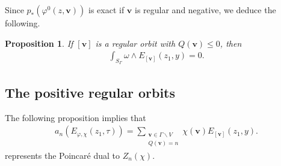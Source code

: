 \documentclass[a4paper,11pt]{amsart} %
\newcommand{\8}{\infty}
\newcommand{\vbf}{\mathbf{v}}
\newcommand{\hooklongrightarrow}{\lhook\joinrel\longrightarrow}
\theoremstyle{mytheoremstyle}
\newtheorem{prop}[thm]{Proposition}
\theoremstyle{remark}
\numberwithin{equation}{section}
\begin{document}
Since $p_\ast\left ( \varphi^0(z,\vbf) \right )$ is exact if $\vbf$ is regular and negative, we deduce the following.

\begin{prop}  \label{exactform} If $[\vbf]$ is a regular orbit with $Q(\vbf) \leq 0$, then
\begin{align}
    \int_{S_\Gamma} \omega \wedge E_{[\vbf]}(z_1,y)=0.
\end{align}
\end{prop}
%




\subsection{The positive regular orbits} \label{subsec:positive fourier} 
%
%
%
%
%


The following proposition implies that
\begin{align}
a_n(E_{\varphi, \chi}(z_1,\tau))=\sum_{\substack{\vbf \in \Gamma \backslash V \\ Q(\vbf)=n}}\chi(\vbf)  E_{[\vbf]}(z_1,y).
\end{align}
represents the Poincaré dual to $Z_n(\chi)$.
\end{document}

